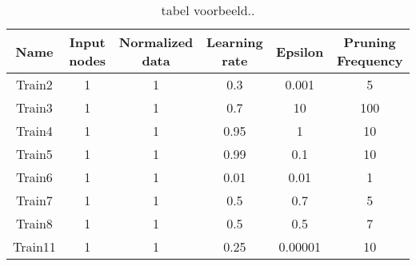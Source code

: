 \documentclass[11pt,fleqn]{book} %
\begin{document}
\begin{table}[h!]
  \centering
    \begin{tabular}{ c c c c c c }
    \hline\hline
    
    Name & Input nodes & Normalized data & Learning rate & Epsilon & Pruning Frequency\\
    \hline
    
    Train2 & 1 & 1 & 0.3 & 0.001 & 5\\
    Train3 & 1 & 1 & 0.7 & 10 & 100\\
    Train4 & 1 & 1 & 0.95 & 1 & 10\\
    Train5 & 1 & 1 & 0.99 & 0.1 & 10\\
    Train6 & 1 & 1 & 0.01 & 0.01 & 1\\
    Train7 & 1 & 1 & 0.5 & 0.7 & 5\\
    Train8 & 1 & 1 & 0.5 & 0.5 & 7\\
    Train11 & 1 & 1 & 0.25 & 0.00001 & 10\\
    
    \hline
  \end{tabular}
  \caption{tabel voorbeeld..}
  \label{tab:ds9failed}
\end{table}

\cite{book_key}

  
\end{document}
